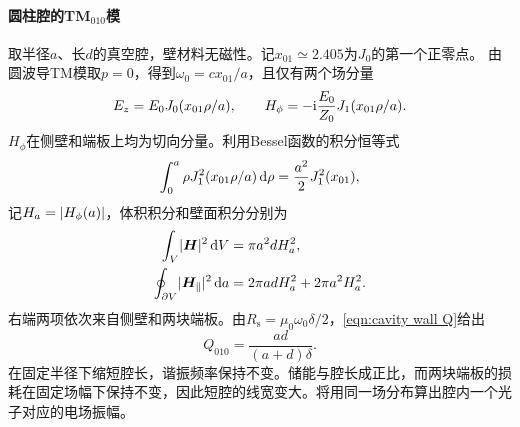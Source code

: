 \paragraph{圆柱腔的TM$_{010}$模}
取半径$a$、长$d$的真空腔，壁材料无磁性。记$x_{01} \simeq 2.405$为$J_0$的第一个正零点。
由圆波导TM模取$p = 0$，得到$\omega_0 = c x_{01}/a$，且仅有两个场分量
\begin{equation}
    \label{eq:ed-tm010-fields}
    E_z = E_0J_0(x_{01}\rho/a),\qquad
    H_\phi = -\mathrm{i}\frac{E_0}{Z_0}J_1(x_{01}\rho/a).
\end{equation}
$H_\phi$在侧壁和端板上均为切向分量。利用Bessel函数的积分恒等式
\[
    \int_0^a\rho J_1^2(x_{01}\rho/a)\mathop{}\!\mathrm{d}\rho = \frac{a^2}{2}J_1^2(x_{01}),
\]
记$H_a = \lvert H_\phi(a)\rvert$，体积积分和壁面积分分别为
\begin{align*}
    \int_V\lvert\bm H\rvert^2\mathop{}\!\mathrm{d} V &= \pi a^2d H_a^2,\\
    \oint_{\partial V}\lvert\bm H_\parallel\rvert^2\mathop{}\!\mathrm{d} a &= 2\pi ad H_a^2 + 2\pi a^2 H_a^2.
\end{align*}
右端两项依次来自侧壁和两块端板。由$R_{\mathrm s} = \mu_0\omega_0\delta/2$，\eqref{eqn:cavity wall Q}给出
\begin{equation}
    Q_{010} = \frac{ad}{(a + d)\delta}.
\end{equation}
在固定半径下缩短腔长，谐振频率保持不变。储能与腔长成正比，而两块端板的损耗在固定场幅下保持不变，因此短腔的线宽变大。将用同一场分布算出腔内一个光子对应的电场振幅。
